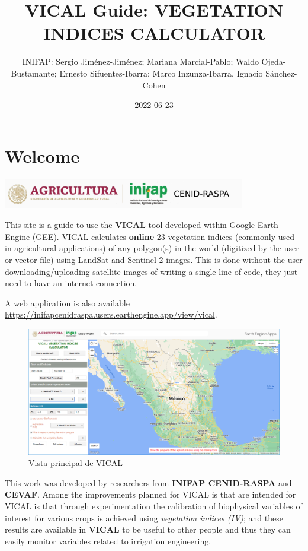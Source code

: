 \documentclass[
]{book}
\title{VICAL Guide: VEGETATION INDICES CALCULATOR}
\author{INIFAP: Sergio Jiménez-Jiménez; Mariana Marcial-Pablo; Waldo Ojeda-Bustamante; Ernesto Sifuentes-Ibarra; Marco Inzunza-Ibarra, Ignacio Sánchez-Cohen}
\date{2022-06-23}
\begin{document}
\maketitle

{
\setcounter{tocdepth}{1}
\tableofcontents
}
\hypertarget{welcome}{%
\chapter*{Welcome}\label{welcome}}

\begin{center}\includegraphics{./images/LogoVICAL} \end{center}

This site is a guide to use the \textbf{VICAL} tool developed within Google Earth Engine (GEE). VICAL calculates \textbf{online} 23 vegetation indices (commonly used in agricultural applications) of any polygon(s) in the world (digitized by the user or vector file) using LandSat and Sentinel-2 images. This is done without the user downloading/uploading satellite images of writing a single line of code, they just need to have an internet connection.

A web application is also available \url{https://inifapcenidraspa.users.earthengine.app/view/vical}.

\begin{figure}

{\centering \includegraphics[width=0.9\linewidth]{./images/Figure4} 

}

\caption{Vista principal de VICAL}\label{fig:fig2}
\end{figure}

This work was developed by researchers from \textbf{INIFAP CENID-RASPA} and \textbf{CEVAF}. Among the improvements planned for VICAL is that are intended for VICAL is that through experimentation the calibration of biophysical variables of interest for various crops is achieved using \emph{vegetation indices (IV)}; and these results are available in \textbf{VICAL} to be useful to other people and thus they can easily monitor variables related to irrigation engineering.
\end{document}
